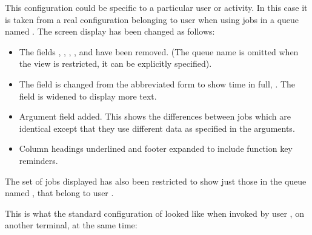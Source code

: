 This configuration could be specific to a particular user or activity.
In this case it is taken from a real configuration belonging to user
 when using jobs in a queue named
. The screen display has been changed as
follows:

\begin{itemize}
\item The fields , , , , and  have been
removed. (The queue name is omitted when the view is restricted, it can be explicitly specified).
\item The  field is changed from the abbreviated form to show time in full,
. The  field is widened to display more text.
\item Argument field added. This shows the differences between jobs which are identical except that they use different data as specified in
the arguments.
\item Column headings underlined and footer expanded to include function
key reminders.
\end{itemize}

The set of jobs displayed has also been restricted to show just those in the queue named , that belong to user .

This is what the standard configuration of \PrBtq{} looked like when invoked by user , on
another terminal, at the same time:

